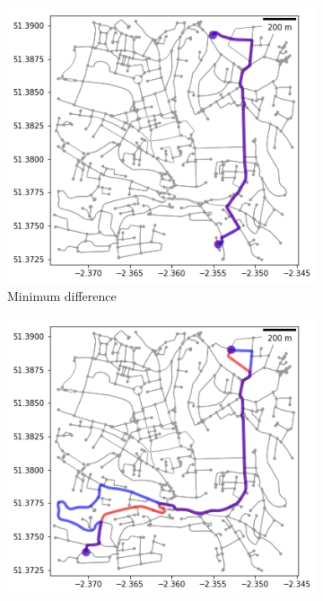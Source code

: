 \documentclass[11pt]{report}
\begin{document}
\begin{figure}[!tb]
    \centering
    \begin{minipage}{1\linewidth}
            \begin{subfigure}[t]{.5\linewidth}
                \includegraphics[width=\textwidth]{images/health_optimal_route_min}
                \caption{Minimum difference}
                \label{fig:route_min}
            \end{subfigure}
            \begin{subfigure}[t]{.5\linewidth}
            	\includegraphics[width=\textwidth]{images/health_optimal_route_median}

\end{subfigure}
\end{minipage}
\end{figure}
\end{document}
